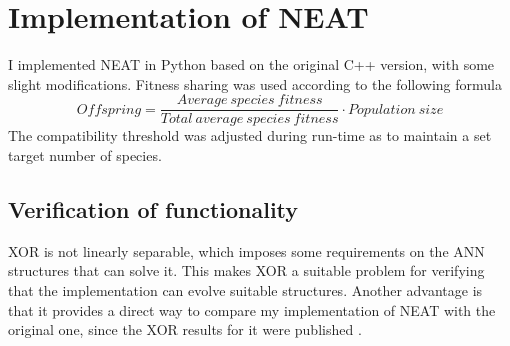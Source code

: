 \section{Implementation of NEAT}

I implemented NEAT in Python based on the original C++ version, with some slight modifications.
Fitness sharing was used according to the following formula
\begin{equation*} \label{eq:1}
    Offspring = \frac{Average\:species\:fitness}{Total\:average\:species\:fitness} \cdot Population\:size
\end{equation*}
The compatibility threshold was adjusted during run-time as to maintain a set target number of species.

\subsection{Verification of functionality}
XOR is not linearly separable, which imposes some requirements on the ANN structures that can solve it.
This makes XOR a suitable problem for verifying that the implementation can evolve suitable structures.
Another advantage is that it provides a direct way to compare my
implementation of NEAT with the original one, since the XOR results for it were published \cite{neat_main}.


%        
%        



